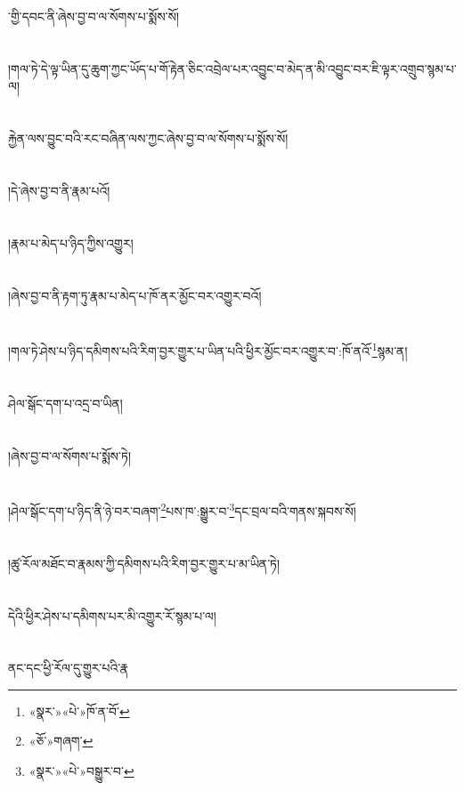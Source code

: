 ་གྱི་དབང་ནི་ཞེས་བྱ་བ་ལ་སོགས་པ་སྨོས་སོ།\chapter{ }།གལ་ཏེ་དེ་ལྟ་ཡིན་དུ་ཆུག་ཀྱང་ཡོད་པ་གོ་རྟེན་ཅིང་འབྲེལ་པར་འབྱུང་བ་མེད་ན་མི་འབྱུང་བར་ཇི་ལྟར་འགྲུབ་སྙམ་པ་ལ།\chapter{ }རྐྱེན་ལས་བྱུང་བའི་རང་བཞིན་ལས་ཀྱང་ཞེས་བྱ་བ་ལ་སོགས་པ་སྨོས་སོ།\chapter{ }།དེ་ཞེས་བྱ་བ་ནི་རྣམ་པའོ།\chapter{ }།རྣམ་པ་མེད་པ་ཉིད་ཀྱིས་འགྱུར།\chapter{ }།ཞེས་བྱ་བ་ནི་རྟག་ཏུ་རྣམ་པ་མེད་པ་ཁོ་ནར་མྱོང་བར་འགྱུར་བའོ།\chapter{ }།གལ་ཏེ་ཤེས་པ་ཉིད་དམིགས་པའི་རིག་བྱར་གྱུར་པ་ཡིན་པའི་ཕྱིར་མྱོང་བར་འགྱུར་བ་:ཁོ་ནའོ་\footnote{«སྣར་»«པེ་»ཁོ་ན་བོ་}སྙམ་ན།\chapter{ }ཤེལ་སྒོང་དག་པ་འདྲ་བ་ཡིན།\chapter{ }།ཞེས་བྱ་བ་ལ་སོགས་པ་སྨོས་ཏེ།\chapter{ }།ཤེལ་སྒོང་དག་པ་ཉིད་ནི་ཉེ་བར་བཞག་\footnote{«ཅོ་»གཞག་}པས་ཁ་:སྒྱུར་བ་\footnote{«སྣར་»«པེ་»བསྒྱུར་བ་}དང་བྲལ་བའི་གནས་སྐབས་སོ།\chapter{ }།ཚུ་རོལ་མཐོང་བ་རྣམས་ཀྱི་དམིགས་པའི་རིག་བྱར་གྱུར་པ་མ་ཡིན་ཏེ།\chapter{ }དེའི་ཕྱིར་ཤེས་པ་དམིགས་པར་མི་འགྱུར་རོ་སྙམ་པ་ལ།\chapter{ }ནང་དང་ཕྱི་རོལ་དུ་གྱུར་པའི་རྣ